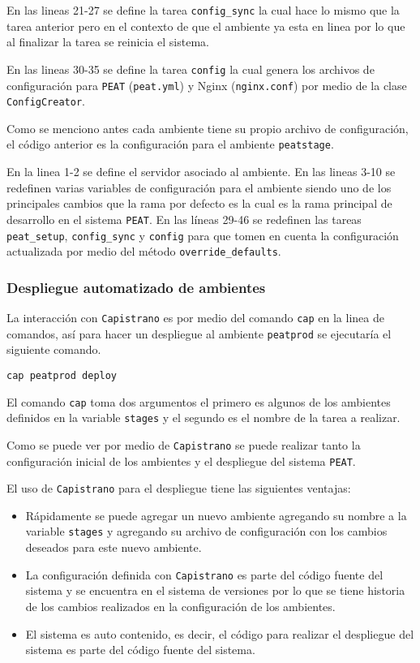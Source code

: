 En las lineas 21-27 se define la tarea \texttt{config\_sync} la cual
hace lo mismo que la tarea anterior pero en el contexto de que el ambiente
ya esta en linea por lo que al finalizar la tarea se reinicia el sistema.

En las lineas 30-35 se define la tarea \texttt{config} la cual genera
los archivos de configuración para \texttt{PEAT} (\texttt{peat.yml}) y
Nginx (\texttt{nginx.conf}) por medio de la clase \texttt{ConfigCreator}.



Como se menciono antes cada ambiente tiene su propio archivo de configuración,
el código anterior es la configuración para el ambiente \texttt{peatstage}.

En la linea 1-2 se define el servidor asociado al ambiente. En las lineas
3-10 se redefinen varias variables de configuración para el ambiente siendo uno
de los principales cambios que la rama por defecto es  la
cual es la rama principal de desarrollo en el sistema \texttt{PEAT}.
En las líneas 29-46 se redefinen las tareas \texttt{peat\_setup},
\texttt{config\_sync} y \texttt{config} para que tomen en cuenta la configuración
actualizada por medio del método \texttt{override\_defaults}.

\subsubsection{Despliegue automatizado de ambientes}

La interacción con \texttt{Capistrano} es por medio del comando \texttt{cap}
en la linea de comandos, así para hacer un despliegue al ambiente \texttt{peatprod}
se ejecutaría el siguiente comando.

\begin{verbatim}
cap peatprod deploy
\end{verbatim}

El comando \texttt{cap} toma dos argumentos el primero es algunos de los
ambientes definidos en la variable \texttt{stages} y el segundo es el nombre
de la tarea a realizar.

Como se puede ver por medio de \texttt{Capistrano} se puede realizar tanto
la configuración inicial de los ambientes y el despliegue del sistema \texttt{PEAT}.

El uso de \texttt{Capistrano} para el despliegue tiene las siguientes ventajas:
\begin{itemize}
\item Rápidamente se puede agregar un nuevo ambiente agregando su nombre a la
  variable \texttt{stages} y agregando su archivo de configuración con los
  cambios deseados para este nuevo ambiente.
\item La configuración definida con \texttt{Capistrano} es parte del código fuente
  del sistema y se encuentra en el sistema de versiones por lo que se tiene historia
  de los cambios realizados en la configuración de los ambientes.
\item El sistema es auto contenido, es decir, el código para realizar el despliegue
  del sistema es parte del código fuente del sistema.
\end{itemize}

